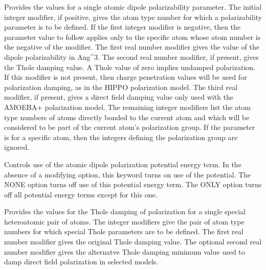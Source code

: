 \documentclass[letterpaper,11pt,english]{sphinxmanual}
\begin{document}
\ignorespaces {}\label{\detokenize{text/keywords:key-polarize}}\begin{description}
\sphinxAtStartPar
Provides the values for a single atomic dipole polarizability parameter. The initial integer modifier, if positive, gives the atom type number for which a polarizability parameter is to be defined. If the first integer modifier is negative, then the parameter value to follow applies only to the specific atom whose atom number is the negative of the modifier. The first real number modifier gives the value of the dipole polarizability in Ang\textasciicircum{}3. The second real number modifier, if present, gives the Thole damping value. A Thole value of zero implies undamped polarization. If this modifier is not present, then charge penetration values will be used for polarization damping, as in the HIPPO polarization model. The third real modifier, if present, gives a direct field damping value only used with the AMOEBA+ polarization model. The remaining integer modifiers list the atom type numbers of atoms directly bonded to the current atom and which will be considered to be part of the current atom’s polarization group. If the parameter is for a specific atom, then the integers defining the polarization group are ignored.

\end{description}

\ignorespaces {}\label{\detokenize{text/keywords:key-polarizeterm}}\begin{description}
\sphinxAtStartPar
Controls use of the atomic dipole polarization potential energy term. In the absence of a modifying option, this keyword turns on use of the potential. The NONE option turns off use of this potential energy term. The ONLY option turns off all potential energy terms except for this one.

\end{description}

\ignorespaces {}\label{\detokenize{text/keywords:key-polpair}}\begin{description}
\sphinxAtStartPar
Provides the values for the Thole damping of polarization for a single special heteroatomic pair of atoms. The integer modifiers give the pair of atom type numbers for which special Thole parameters are to be defined. The first real number modifier gives the original Thole damping value. The optional second real number modifier gives the alternatve Thole damping minimum value used to damp direct field polarization in selected models.

\end{description}
\end{document}
